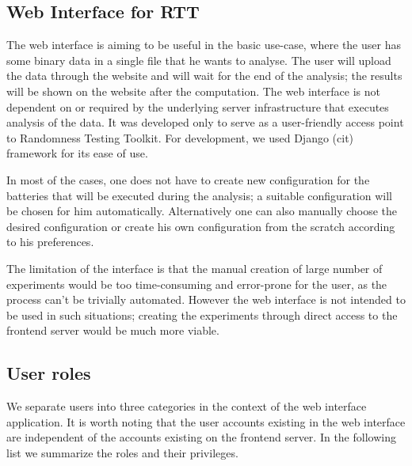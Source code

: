 \documentclass[
  digital,  	%
  color,		%
  oneside,   	%
  12pt,
  nocover,
  notable,
  nolof,
  nolot,
]{fithesis3}
\theoremstyle{definition}
\theoremstyle{remark}
\begin{document}
\subsection{Web Interface for RTT}
The web interface is aiming to be useful in the basic use-case, where the user has some binary data in a single file that he wants to analyse. The user will upload the data through the website and will wait for the end of the analysis; the results will be shown on the website after the computation. The web interface is not dependent on or required by the underlying server infrastructure that executes analysis of the data. It was developed only to serve as a user-friendly access point to Randomness Testing Toolkit. For development, we used Django (cit) framework for its ease of use.

In most of the cases, one does not have to create new configuration for the batteries that will be executed during the analysis; a suitable configuration will be chosen for him automatically. Alternatively one can also manually choose the desired configuration or create his own configuration from the scratch according to his preferences.

The limitation of the interface is that the manual creation of large number of experiments would be too time-consuming and error-prone for the user, as the process can't be trivially automated. However the web interface is not intended to be used in such situations; creating the experiments through direct access to the frontend server would be much more viable. 

\subsection*{User roles}
We separate users into three categories in the context of the web interface application. It is worth noting that the user accounts existing in the web interface are independent of the accounts existing on the frontend server. In the following list we summarize the roles and their privileges.
\end{document}
